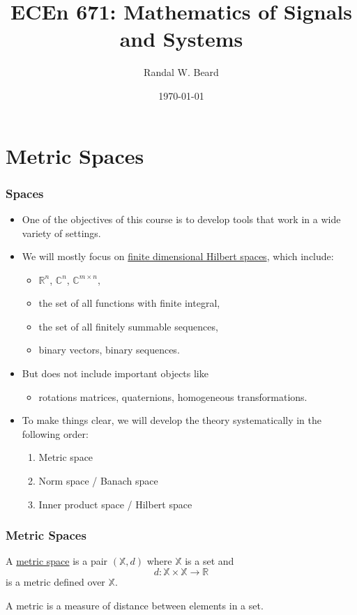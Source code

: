\documentclass{beamer}
\title{ECEn 671: Mathematics of Signals and Systems}
\author{Randal W. Beard}
\institute{Brigham Young University}
\date{\today}
\begin{document}
\begin{frame}
	\titlepage
\end{frame}

\section{Metric Spaces}
\frame{\sectionpage}

\begin{frame}\frametitle{Spaces}

\begin{itemize}
\item One of the objectives of this course is to develop tools that work in a wide variety of settings.  
\item We will mostly focus on \underline{finite dimensional Hilbert spaces}, which include:
	\begin{itemize}
		\item $\mathbb{R}^n$, $\mathbb{C}^n$, $\mathbb{C}^{m\times n}$,
		\item the set of all functions with finite integral,
		\item the set of all finitely summable sequences,
		\item binary vectors, binary sequences.
	\end{itemize}
\item But does not include important objects like 
	\begin{itemize}
	\item rotations matrices, quaternions, homogeneous transformations.	
	\end{itemize}
\item To make things clear, we will develop the theory systematically in the following order:
	\begin{enumerate}
		\item Metric space
		\item Norm space / Banach space
		\item Inner product space / Hilbert space
	\end{enumerate}
\end{itemize}
\end{frame}

\begin{frame}\frametitle{Metric Spaces}

\begin{definition} A \underline{metric space} is a pair $(\mathbb{X},d)$ where $\mathbb{X}$ is a set and 
	\[
	d:\mathbb{X} \times \mathbb{X} \to \mathbb{R}
	\]
	is a metric defined over $\mathbb{X}$.\\
\end{definition}
	
A metric is a measure of distance between elements in a set.
\end{frame}
\end{document}
